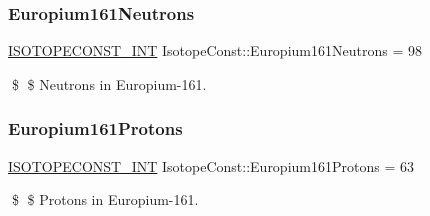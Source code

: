 \subsubsection{\texorpdfstring{Europium161\+Neutrons}{Europium161Neutrons}}
{\footnotesize\ttfamily \mbox{\hyperlink{group___isotope_const-_macros_ga5f18360b3e99483a35c32d789e62621c}{I\+S\+O\+T\+O\+P\+E\+C\+O\+N\+S\+T\+\_\+\+I\+NT}} Isotope\+Const\+::\+Europium161\+Neutrons = 98}

\$ \$ Neutrons in Europium-\/161. \mbox{\label{group___isotope_const-_europium-_eu161_gabc67adb85e16192f288e9e7f56325f75}} 
\subsubsection{\texorpdfstring{Europium161\+Protons}{Europium161Protons}}
{\footnotesize\ttfamily \mbox{\hyperlink{group___isotope_const-_macros_ga5f18360b3e99483a35c32d789e62621c}{I\+S\+O\+T\+O\+P\+E\+C\+O\+N\+S\+T\+\_\+\+I\+NT}} Isotope\+Const\+::\+Europium161\+Protons = 63}

\$ \$ Protons in Europium-\/161. 